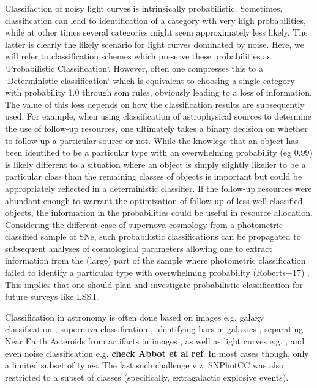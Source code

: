 Classifaction of noisy light curves is intrinsically probabilistic. Sometimes, classification can lead to identification of a category wth very high probabilities, while at other times several categories might seem approximately 
less likely. The latter is clearly the likely scenario for light curves dominated by noise.
Here, we will refer to classification schemes which preserve these probabilities as `Probabilistic Classification`.
However, often one compresses this to a  
 `Deterministic classification` which is equivalent to choosing a single category with probability 1.0 through som 
rules, obviously leading to a loss of information. The value of this loss depends on how the classification results are subsequently used. For example, when using classification of astrophysical sources to determine the use of follow-up resources, one ultimately takes a binary decision on whether to follow-up a particular source or not. While the knowlege that an object has been identified to be a particular type with an overwhelming probability (eg 0.99) is likely different to a situation where an object is simply slightly likelier to be a particular class than the remaining classes of objects is important but could be appropriately reflected in a deterministic classifier. If the follow-up resources were abundant enough to warrant the optimization of follow-up of less well classified objects,  the information in the probabilities could be useful in resource allocation. Considering the different case of supernova cosmology from a photometric classified sample of SNe, such probabilistic classifications can be propagated to subsequent analyses of cosmological parameters allowing one to extract information from the (large) part of the sample where photometric classification failed to identify a particular type with overwhelming probability (Roberts+17) . This implies that one should plan and investigate probabilistic classification for future surveys like LSST. 

Classification in astronomy is often done based on images e.g.
galaxy classification \cite{2016A&C....16...34H}, supernova
classification \cite{2017ApJ...836...97C}, identifying bars in galaxies
\cite{2018MNRAS.477..894A}, separating Near Earth Asteroids from artifacts in images
\cite{2016PASJ...68..104M}, as well as light curves e.g. \cite{2016PASJ...68..104M,2017arXiv170906257M,2017CQGra..34f4003Z}, and even noise classification e.g. \textbf{check Abbot et al ref}\cite{2017CQGra..34f4003Z,2018PhRvD..97j1501G}. In most cases though, only a limited subset of types. The last such challenge viz. SNPhotCC was also restricted to a subset of classes (specifically, extragalactic explosive events).

